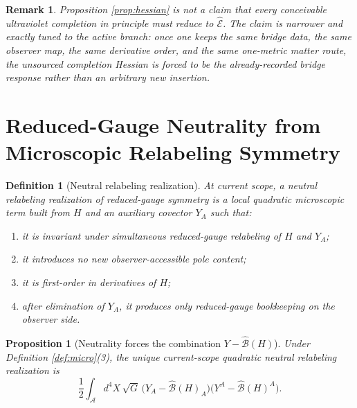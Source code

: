 \documentclass[11pt]{article}
\newcommand{\Sub}{\mathcal A}
\newcommand{\SubEinLin}{\widehat{\mathcal E}}
\newcommand{\SubGaugeVec}{\widehat{\mathcal B}}
\newcommand{\GaugeAux}{Y}
\newtheorem{definition}{Definition}
\newtheorem{proposition}{Proposition}
\newtheorem{remark}{Remark}
\begin{document}
\begin{remark}
Proposition \ref{prop:hessian} is not a claim that every conceivable ultraviolet completion in principle must reduce to \(\SubEinLin\). The claim is narrower and exactly tuned to the active branch: once one keeps the same bridge data, the same observer map, the same derivative order, and the same one-metric matter route, the unsourced completion Hessian is forced to be the already-recorded bridge response rather than an arbitrary new insertion.
\end{remark}

\section{Reduced-Gauge Neutrality from Microscopic Relabeling Symmetry}

\begin{definition}[Neutral relabeling realization]
\label{def:neutral}
At current scope, a \emph{neutral relabeling realization} of reduced-gauge symmetry is a local quadratic microscopic term built from \(H\) and an auxiliary covector \(\GaugeAux_A\) such that:
\begin{enumerate}
    \item it is invariant under simultaneous reduced-gauge relabeling of \(H\) and \(\GaugeAux_A\);
    \item it introduces no new observer-accessible pole content;
    \item it is first-order in derivatives of \(H\);
    \item after elimination of \(\GaugeAux_A\), it produces only reduced-gauge bookkeeping on the observer side.
\end{enumerate}
\end{definition}

\begin{proposition}[Neutrality forces the combination \(\GaugeAux-\SubGaugeVec(H)\)]
\label{prop:neutralcombo}
Under Definition \ref{def:micro}(3), the unique current-scope quadratic neutral relabeling realization is
\begin{equation}
\frac12
\int_{\Sub} d^4X\,\sqrt{G}\,
\bigl(\GaugeAux_A-\SubGaugeVec(H)_A\bigr)
\bigl(\GaugeAux^A-\SubGaugeVec(H)^A\bigr).
\label{eq:neutralterm}
\end{equation}
\end{proposition}
\end{document}
